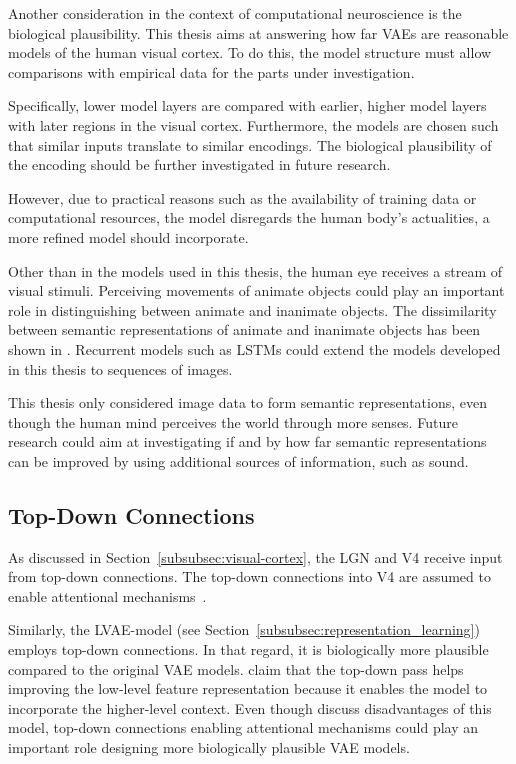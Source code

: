 Another consideration in the context of computational neuroscience is the biological plausibility.
This thesis aims at answering how far \acp{VAE} are reasonable models of the human visual cortex.
To do this, the model structure must allow comparisons with empirical data for the parts under investigation.

Specifically, lower model layers are compared with earlier, higher model layers with later regions in the visual cortex.
Furthermore, the models are chosen such that similar inputs translate to similar encodings.
The biological plausibility of the encoding should be further investigated in future research.

However, due to practical reasons such as the availability of training data or computational resources, the model disregards the human body's actualities, a more refined model should incorporate.

Other than in the models used in this thesis, the human eye receives a stream of visual stimuli.
Perceiving movements of animate objects could play an important role in distinguishing between animate and inanimate objects.
The dissimilarity between semantic representations of animate and inanimate objects has been shown in \citet{khaligh2014deep}.
Recurrent models such as LSTMs could extend the models developed in this thesis to sequences of images.

This thesis only considered image data to form semantic representations, even though the human mind perceives the world through more senses.
Future research could aim at investigating if and by how far semantic representations can be improved by using additional sources of information, such as sound.

\subsection{Top-Down Connections}\label{subsec:feedback-connections-of-the-lateral-geniculate-nucleus}
As discussed in Section~\ref{subsubsec:visual-cortex}, the \ac{LGN} and \ac{V4} receive input from top-down connections.
The top-down connections into \ac{V4} are assumed to enable attentional mechanisms~\citep{roe2012toward}.

Similarly, the \ac{LVAE}-model (see Section~\ref{subsubsec:representation_learning}) employs top-down connections.
In that regard, it is biologically more plausible compared to the original \ac{VAE} models.
\citet{sonderby2016ladder} claim that the top-down pass helps improving the low-level feature representation because it enables the model to incorporate the higher-level context.
Even though \citet{zhao2017learning} discuss disadvantages of this model, top-down connections enabling attentional mechanisms could play an important role designing more biologically plausible \ac{VAE} models.

